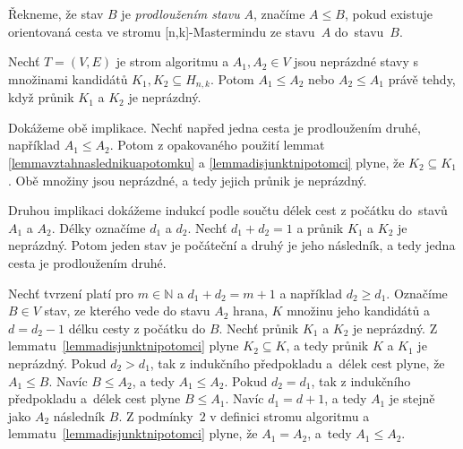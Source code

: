 \begin{definice}
    Řekneme, že stav $B$ je \emph{prodloužením stavu} $A$, značíme $A \leq B$, pokud existuje orientovaná cesta ve stromu [n,k]-Mastermindu ze stavu~$A$ do~stavu~$B$. 
\end{definice}


\begin{lemma}\label{lemmaprunikacestastromalg}
    Nechť $T = (V,E)$ je strom algoritmu a $A_1, A_2 \in V$ jsou neprázdné stavy s množinami kandidátů $K_1, K_2 \subseteq H_{n,k}$. Potom $A_1 \leq A_2$ nebo $A_2 \leq A_1$ právě tehdy, když průnik $K_1$ a $K_2$ je neprázdný.
\end{lemma}
\begin{dukaz}
    Dokážeme obě implikace. Nechť napřed jedna cesta je prodloužením druhé, například $A_1 \leq A_2$. Potom z opakovaného použití lemmat \ref{lemmavztahnaslednikuapotomku} a \ref{lemmadisjunktnipotomci} plyne, že $K_2 \subseteq K_1$. Obě množiny jsou neprázdné, a tedy jejich průnik je neprázdný. 

    Druhou implikaci dokážeme indukcí podle součtu délek cest z počátku do~stavů $A_1$ a $A_2$. Délky označíme $d_1$ a $d_2$. Nechť $d_1 + d_2 = 1$ a průnik $K_1$ a $K_2$ je neprázdný. Potom jeden stav je počáteční a druhý je jeho následník, a tedy jedna cesta je prodloužením druhé.


    Nechť tvrzení platí pro $m \in \mathbb{N}$ a $d_1 + d_2 = m+1$ a například $d_2 \geq d_1$. Označíme $B \in V$ stav, ze kterého vede do stavu $A_2$ hrana, $K$ množinu jeho kandidátů a~$d = d_2-1$ délku cesty z počátku do $B$. Nechť průnik $K_1$ a $K_2$ je neprázdný. Z lemmatu~\ref{lemmadisjunktnipotomci} plyne $K_2 \subseteq K$, a tedy průnik $K$ a $K_1$ je neprázdný. Pokud $d_2 > d_1$, tak z indukčního předpokladu a~délek cest plyne, že $A_1 \leq B$. Navíc $B\leq A_2$, a tedy $A_1 \leq A_2$. Pokud $d_2 = d_1$, tak z indukčního předpokladu a~délek cest plyne $B \leq A_1$. Navíc $d_1 = d+1$, a tedy $A_1$ je stejně jako $A_2$ následník $B$. Z podmínky~$2$ v definici stromu algoritmu a lemmatu~\ref{lemmadisjunktnipotomci} plyne, že $A_1 = A_2$, a~tedy $A_1 \leq A_2$. 
\end{dukaz}


